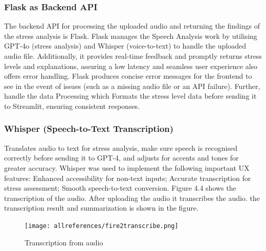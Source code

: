 \documentclass[Arial,12pt,openright,twoside]{book}
\begin{document}
    \subsubsection{ Flask as Backend API}
    The backend API for processing the uploaded audio and returning the findings of the stress analysis is Flask. Flask manages the Speech Analysis work by utilising GPT-4o (stress analysis) and Whisper (voice-to-text) to handle the uploaded audio file. Additionally, it provides real-time feedback and promptly returns stress levels and explanations, assuring a low latency and seamless user experience also offers error handling. Flask produces concise error messages for the frontend to see in the event of issues (such as a missing audio file or an API failure). Further,  handle the data Processing which Formats the stress level data before sending it to Streamlit, ensuring consistent responses. 
        \subsubsection{Whisper (Speech-to-Text Transcription)}
Translates audio to text for stress analysis, make sure speech is recognised correctly before sending it to GPT-4, and adjusts for accents and tones for greater accuracy. Whisper was used to implement the following important UX features: Enhanced accessibility for non-text inputs;  Accurate transcription for stress assessment; Smooth speech-to-text conversion. Figure 4.4 shows the transcription of the audio. After uploading the audio it transcribes the audio. the transcription result and summarization is shown in the figure.
\vspace{10pt} %
\begin{figure}[htbp!]
    \centering
    \texttt{[image: allreferences/fire2transcribe.png]}
    \caption{Transcription from audio}
    \label{fig:system_architecture}
\end{figure}
\vspace{10pt} %
\vspace{10pt} %
\end{document}
